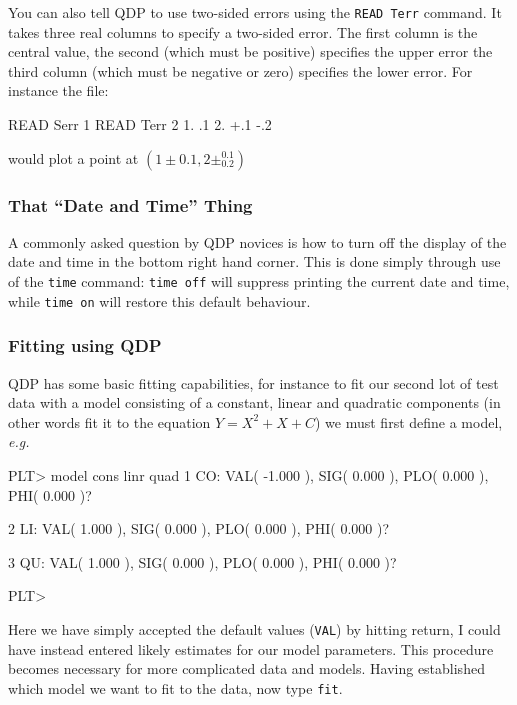 \documentclass[twoside,11pt]{starlink}
\begin{document}
You can also tell QDP to use two-sided errors using the \texttt{READ
Terr} command. It takes three real columns to specify a two-sided
error. The first column is the central value, the second (which must
be positive) specifies the upper error the third column (which must be
negative or zero) specifies the lower error.  For instance the file:

\begin{small}
\begin{terminalv}
READ Serr 1
READ Terr 2
 1. .1    2. +.1 -.2
\end{terminalv}
\end{small}

would plot a point at $(1\pm0.1,2\pm^{0.1}_{0.2})$

\subsubsection{That ``Date and Time'' Thing}

A commonly asked question by QDP novices is how to turn off the
display of the date and time in the bottom right hand corner. This is
done simply through use of the \texttt{time} command: \texttt{time off} will
suppress printing the current date and time, while \texttt{time on} will
restore this default behaviour.

\subsubsection{Fitting using QDP}

QDP has some basic fitting capabilities, for instance to fit our
second lot of test data with a model consisting of a constant, linear
and quadratic components (in other words fit it to the equation $Y =
X^{2} + X + C$) we must first define a model, \emph{e.g.\ }

\begin{small}
\begin{terminalv}
PLT> model cons linr quad
  1 CO: VAL( -1.000    ), SIG(  0.000    ), PLO(  0.000    ), PHI(  0.000    )?

  2 LI: VAL(  1.000    ), SIG(  0.000    ), PLO(  0.000    ), PHI(  0.000    )?

  3 QU: VAL(  1.000    ), SIG(  0.000    ), PLO(  0.000    ), PHI(  0.000    )?

PLT>
\end{terminalv}
\end{small}

Here we have simply accepted the default values (\texttt{VAL}) by hitting
return, I could have instead entered likely estimates for our model
parameters. This procedure becomes necessary for more complicated data
and models. Having established which model we want to fit to the data,
now type \texttt{fit}.
\end{document}

